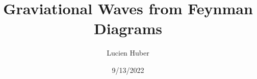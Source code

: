 \documentclass[
  letterpaper,
  DIV=11,
  numbers=noendperiod,
  oneside]{scrreprt}
\title{Graviational Waves from Feynman Diagrams}
\author{Lucien Huber}
\date{9/13/2022}
\begin{document}
\maketitle

\newcommand{\mathtip}[2]{#1}
\newcommand{\texttip}[2]{#1}


\newcommand{\ind}[2]{^{#1}_{\phantom{#1}#2}} 	
\newcommand{\invind}[2]{_{#1}^{\phantom{#1}#2}}
\newcommand{\notipiunit}{{\mathring{\imath}}}
\newcommand{\iunit}{\mathtip{\notipiunit}{\text{Complex unit: } \notipiunit^2 = -1}}
\let\i\oldi
\newcommand{\i}{\iunit}

\let\exp\oldexp
\newcommand{\exp}[1]{\texttip{\mathrm{e}^{#1}}{exponential function}}
\newcommand{\Exp}[2][\paren]{\texttip{\exp#1{#2}}{exponential function}} 

\newcommand{\partialder}{\partial}
\newcommand{\differential}{\mathrm{d}}


\newcommand{\pdv}[3][]{\frac{\partialder^{#1} #2}{\partialder #3^{#1}}} 
\newcommand{\odv}[3][]{\frac{\differential^{#1} #2}{\differential #3^{#1}}}
\newcommand{\mdv}[3][]{\frac{\mathrm{D}^{#1} #2}{\mathrm{D} #3^{#1}}}
\newcommand{\fdv}[3][]{\frac{\delta^{#1} #2}{\delta #3^{#1}}}
\newcommand{\jdv}[3][]{\frac{\partialder ^{#1}(#2)}{\partialder (#3)^{#1}}}
\newcommand{\adv}[3][]{\frac{\Delta^{#1} #2}{\Delta #3^{#1}}}


\newcommand{\ipdv}[3][_]{#2\texttip{{}#1{,#3}}{Partial derivative}}

\newcommand{\covd}[3][_]{#2\texttip{{}#1{;#3}}{Covariant derivative}}

\newcommand{\half}[1][1]{\tfrac{#1}{2}}

\newcommand{\Half}[1][1]{\frac{#1}{2}}

\let\d\oldd
\newcommand{\d}[1]{\,\differential#1\,}
\newcommand{\dd}[2][]{\,\differential^{#1}#2\,}
\newcommand{\greens}[2][ret]{\texttip{\mathcal{G}_{\mathrm{#1}}\left(#2\right)}{#1 Green's function}}

\newcommand{\notipnormalized}[1]{\tilde{#1}}
\newcommand{\normalized}[2][]{\mathtip{\notipnormalized{#2}}{\text{Normalized } #1 =#2(2\pi)^{#1}}}


\newcommand{\dn}[2][]{\,\mathtip{\notipnormalized{\differential}^{#1}#2}{\notipnormalized{\differential}^{#1}#2=\frac{\dd[#1]{#2}}{(2\pi)^{#1}}}\,}

\newcommand{\thetafn}[2][]{\texttip{\Theta^{(#1)}\left(#2\right)}{Heaviside step function}}
\newcommand{\deltafn}[2][]{\texttip{\delta^{(#1)}\left(#2\right)}{Dirac delta function}}
\end{document}
